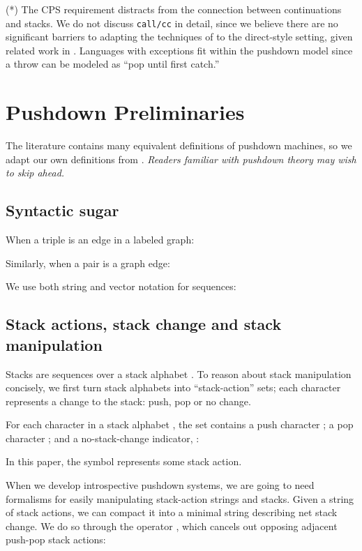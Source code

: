 (*) The CPS requirement distracts from the connection between continuations and stacks.
We do not discuss \texttt{call/cc} in detail, since we believe there are no significant barriers to adapting the techniques of \citet{dvanhorn:Vardoulakis2011Pushdown} to the direct-style setting, given related work in \citet{local:hopa-summaries}.
Languages with exceptions fit within the pushdown model since a throw can be modeled as ``pop until first catch.''


\section{Pushdown Preliminaries}

The literature contains  many equivalent definitions of pushdown machines, so
we adapt our own definitions from \citet{mattmight:Sipser:2005:Theory}.
\emph{Readers familiar with pushdown theory may wish to skip ahead.}



\subsection{Syntactic sugar}

When a triple  is an edge in a labeled graph:

Similarly, when a pair  is a graph edge:

We use both
string and vector notation for sequences:



\subsection{Stack actions, stack change and stack manipulation}


Stacks are sequences over a stack alphabet .
To reason about stack manipulation concisely,
we first turn stack alphabets into ``stack-action'' sets;
each character represents a change to the stack: push, pop or no
change.

For each character  in a stack alphabet , the
 set  contains a push character
; a pop character ;
and a no-stack-change indicator, :

In this paper, the symbol  represents some stack action.


When we develop introspective pushdown systems, we are going
to need formalisms for easily manipulating stack-action strings
and stacks.
Given a string of stack actions, we can compact it into a minimal
string describing net stack change.
We do so through the operator , which cancels out opposing adjacent push-pop stack
actions:

